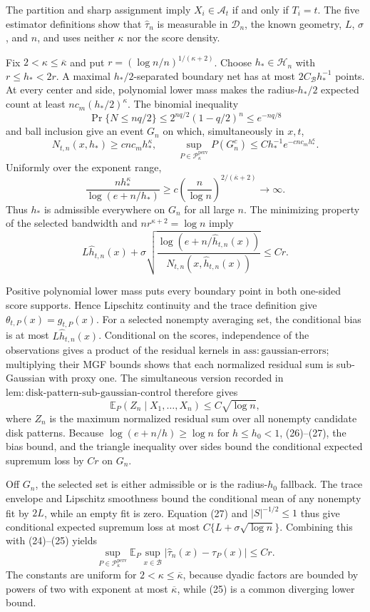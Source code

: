 The partition and sharp assignment imply \(X_i\in\mathcal A_t\) if and only if \(T_i=t\).  The five estimator definitions show that \(\widehat\tau_n\) is measurable in \(\mathcal D_n\), the known geometry, \(L\), \(\sigma\), and \(n\), and uses neither \(\kappa\) nor the score density.

Fix \(2<\kappa\le\overline\kappa\) and put \(r=(\log n/n)^{1/(\kappa+2)}\).  Choose \(h_*\in\mathcal H_n\) with \(r\le h_*<2r\).  A maximal \(h_*/2\)-separated boundary net has at most \(2C_{\mathcal B}h_*^{-1}\) points.  At every center and side, polynomial lower mass makes the radius-\(h_*/2\) expected count at least \(nc_m(h_*/2)^\kappa\).  The binomial inequality
\[
 \Pr\{N\le nq/2\}\le2^{nq/2}(1-q/2)^n\le e^{-nq/8} \tag{23}
\]
and ball inclusion give an event \(G_n\) on which, simultaneously in \(x,t\),
\[
 N_{t,n}(x,h_*)\ge cnc_mh_*^\kappa,\qquad
 \sup_{P\in\mathcal P_\kappa^{\mathrm{perv}}}P(G_n^c)
 \le Ch_*^{-1}e^{-cnc_mh_*^\kappa}. \tag{24}
\]
Uniformly over the exponent range,
\[
 \frac{nh_*^\kappa}{\log(e+n/h_*)}
 \ge c\left(\frac n{\log n}\right)^{2/(\overline\kappa+2)}\longrightarrow\infty. \tag{25}
\]
Thus \(h_*\) is admissible everywhere on \(G_n\) for all large \(n\).  The minimizing property of the selected bandwidth and \(nr^{\kappa+2}=\log n\) imply
\[
 L\widehat h_{t,n}(x)+\sigma\sqrt{\frac{\log(e+n/\widehat h_{t,n}(x))}{N_{t,n}(x,\widehat h_{t,n}(x))}}
 \le Cr. \tag{26}
\]

Positive polynomial lower mass puts every boundary point in both one-sided score supports.  Hence Lipschitz continuity and the trace definition give \(\theta_{t,P}(x)=g_{t,P}(x)\).  For a selected nonempty averaging set, the conditional bias is at most \(L\widehat h_{t,n}(x)\).  Conditional on the scores, independence of the observations gives a product of the residual kernels in \(\mathrm{ass:gaussian\text{-}errors}\); multiplying their MGF bounds shows that each normalized residual sum is sub-Gaussian with proxy one.  The simultaneous version recorded in \(\mathrm{lem:disk\text{-}pattern\text{-}sub\text{-}gaussian\text{-}control}\) therefore gives
\[
 \mathbb E_P(Z_n\mid X_1,\ldots,X_n)\le C\sqrt{\log n}, \tag{27}
\]
where \(Z_n\) is the maximum normalized residual sum over all nonempty candidate disk patterns.  Because \(\log(e+n/h)\ge\log n\) for \(h\le h_0<1\), (26)--(27), the bias bound, and the triangle inequality over sides bound the conditional expected supremum loss by \(Cr\) on \(G_n\).

Off \(G_n\), the selected set is either admissible or is the radius-\(h_0\) fallback.  The trace envelope and Lipschitz smoothness bound the conditional mean of any nonempty fit by \(2L\), while an empty fit is zero.  Equation (27) and \(|S|^{-1/2}\le1\) thus give conditional expected supremum loss at most \(C\{L+\sigma\sqrt{\log n}\}\).  Combining this with (24)--(25) yields
\[
 \sup_{P\in\mathcal P_\kappa^{\mathrm{perv}}}
 \mathbb E_P\sup_{x\in\mathcal B}|\widehat\tau_n(x)-\tau_P(x)|\le Cr. \tag{28}
\]
The constants are uniform for \(2<\kappa\le\overline\kappa\), because dyadic factors are bounded by powers of two with exponent at most \(\overline\kappa\), while (25) is a common diverging lower bound.

